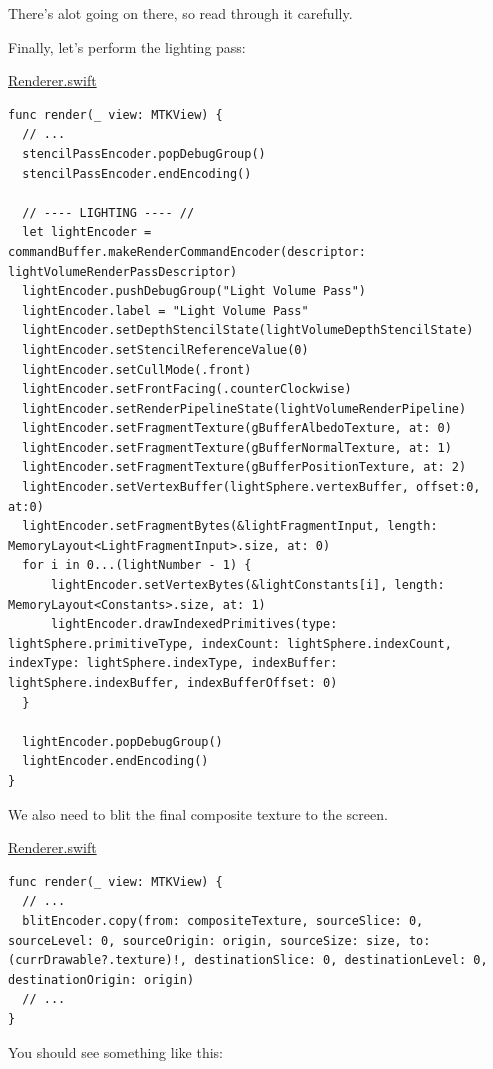 \documentclass[11pt]{article}
\begin{document}
There's alot going on there, so read through it carefully.

Finally, let's perform the lighting pass:

\uline{Renderer.swift}
\begin{verbatim}
func render(_ view: MTKView) {
  // ...
  stencilPassEncoder.popDebugGroup()
  stencilPassEncoder.endEncoding()

  // ---- LIGHTING ---- //
  let lightEncoder = commandBuffer.makeRenderCommandEncoder(descriptor: lightVolumeRenderPassDescriptor)
  lightEncoder.pushDebugGroup("Light Volume Pass")
  lightEncoder.label = "Light Volume Pass"
  lightEncoder.setDepthStencilState(lightVolumeDepthStencilState)
  lightEncoder.setStencilReferenceValue(0)
  lightEncoder.setCullMode(.front)
  lightEncoder.setFrontFacing(.counterClockwise)
  lightEncoder.setRenderPipelineState(lightVolumeRenderPipeline)
  lightEncoder.setFragmentTexture(gBufferAlbedoTexture, at: 0)
  lightEncoder.setFragmentTexture(gBufferNormalTexture, at: 1)
  lightEncoder.setFragmentTexture(gBufferPositionTexture, at: 2)
  lightEncoder.setVertexBuffer(lightSphere.vertexBuffer, offset:0, at:0)
  lightEncoder.setFragmentBytes(&lightFragmentInput, length: MemoryLayout<LightFragmentInput>.size, at: 0)
  for i in 0...(lightNumber - 1) {
      lightEncoder.setVertexBytes(&lightConstants[i], length: MemoryLayout<Constants>.size, at: 1)
      lightEncoder.drawIndexedPrimitives(type: lightSphere.primitiveType, indexCount: lightSphere.indexCount, indexType: lightSphere.indexType, indexBuffer: lightSphere.indexBuffer, indexBufferOffset: 0)
  }

  lightEncoder.popDebugGroup()
  lightEncoder.endEncoding()
}
\end{verbatim}

We also need to blit the final composite texture to the screen.

\uline{Renderer.swift}
\begin{verbatim}
func render(_ view: MTKView) {
  // ...
  blitEncoder.copy(from: compositeTexture, sourceSlice: 0, sourceLevel: 0, sourceOrigin: origin, sourceSize: size, to: (currDrawable?.texture)!, destinationSlice: 0, destinationLevel: 0, destinationOrigin: origin)
  // ...
}
\end{verbatim}

You should see something like this:
\end{document}
